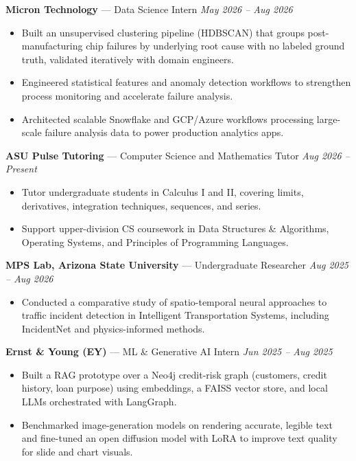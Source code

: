 \documentclass[a4paper,8pt]{extarticle}
\begin{document}
\noindent
\textbf{Micron Technology} --- Data Science Intern
\hfill \textit{May 2026 -- Aug 2026}

\begin{itemize}
\item Built an unsupervised clustering pipeline (HDBSCAN) that groups post-manufacturing chip failures by underlying root cause with no labeled ground truth, validated iteratively with domain engineers.
\item Engineered statistical features and anomaly detection workflows to strengthen process monitoring and accelerate failure analysis.
\item Architected scalable Snowflake and GCP/Azure workflows processing large-scale failure analysis data to power production analytics apps.
\end{itemize}

\noindent
\textbf{ASU Pulse Tutoring} --- Computer Science and Mathematics Tutor
\hfill \textit{Aug 2026 -- Present}

\begin{itemize}
\item Tutor undergraduate students in Calculus I and II, covering limits, derivatives, integration techniques, sequences, and series.
\item Support upper-division CS coursework in Data Structures \& Algorithms, Operating Systems, and Principles of Programming Languages.
\end{itemize}

\noindent
\textbf{MPS Lab, Arizona State University} --- Undergraduate Researcher
\hfill \textit{Aug 2025 -- Aug 2026}

\begin{itemize}
\item Conducted a comparative study of spatio-temporal neural approaches to traffic incident detection in Intelligent Transportation Systems, including IncidentNet and physics-informed methods.
\end{itemize}

\noindent
\textbf{Ernst \& Young (EY)} --- ML \& Generative AI Intern
\hfill \textit{Jun 2025 -- Aug 2025}

\begin{itemize}
\item Built a RAG prototype over a Neo4j credit-risk graph (customers, credit history, loan purpose) using embeddings, a FAISS vector store, and local LLMs orchestrated with LangGraph.
\item Benchmarked image-generation models on rendering accurate, legible text and fine-tuned an open diffusion model with LoRA to improve text quality for slide and chart visuals.
\end{itemize}
\end{document}
